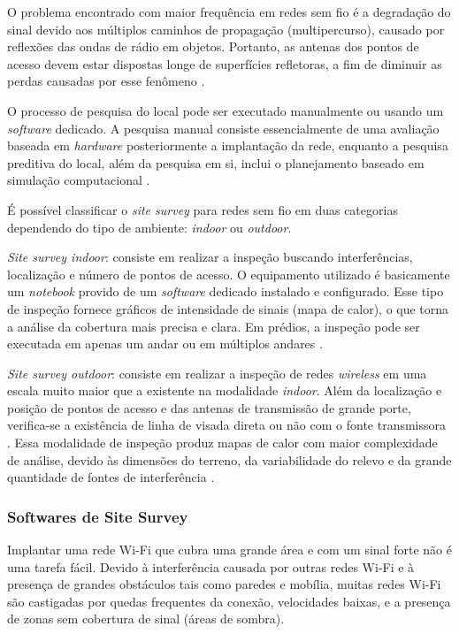 O problema encontrado com maior frequência em redes sem fio é a degradação do sinal devido aos múltiplos caminhos de propagação (multipercurso), causado por reflexões das ondas de rádio em objetos. Portanto, as antenas dos pontos de acesso devem estar dispostas longe de superfícies refletoras, a fim de diminuir as perdas causadas por esse fenômeno \cite{kar2018ieee}.

O processo de pesquisa do local pode ser executado manualmente ou usando um \textit{software} dedicado. A pesquisa manual consiste essencialmente de uma avaliação baseada em \textit{hardware} posteriormente a implantação da rede, enquanto a pesquisa preditiva do local, além da pesquisa em si, inclui o planejamento baseado em simulação computacional \cite{kar2018ieee}.

É possível classificar o \textit{site survey} para redes sem fio em duas categorias dependendo do tipo de ambiente: \textit{indoor} ou \textit{outdoor}.

\textit{Site survey indoor}: consiste em realizar a inspeção buscando interferências, localização e número de pontos de acesso. O equipamento utilizado é basicamente um \textit{notebook} provido de um \textit{software} dedicado instalado e configurado. Esse tipo de inspeção fornece gráficos de intensidade de sinais (mapa de calor), o que torna a análise da cobertura mais precisa e clara. Em prédios, a inspeção pode ser executada em apenas um andar ou em múltiplos andares .

\textit{Site survey outdoor}: consiste em realizar a inspeção de redes \textit{wireless} em uma escala muito maior que a existente na modalidade \textit{indoor}. Além da localização e posição de pontos de acesso e das antenas de transmissão de grande porte, verifica-se a existência de linha de visada direta ou não com o fonte transmissora \cite{pinheiro2004site}. Essa modalidade de inspeção produz mapas de calor com maior complexidade de análise, devido às dimensões do terreno, da variabilidade do relevo e da grande quantidade de fontes de interferência .

\subsubsection{Softwares de Site Survey}
\label{subsubsec:softwares-site-survey}

Implantar uma rede Wi-Fi que cubra uma grande área e com um sinal forte não é uma tarefa fácil. Devido à interferência causada por outras redes Wi-Fi e à presença de grandes obstáculos tais como paredes e mobília, muitas redes Wi-Fi são castigadas por quedas frequentes da conexão, velocidades baixas, e a presença de zonas sem cobertura de sinal (áreas de sombra).

